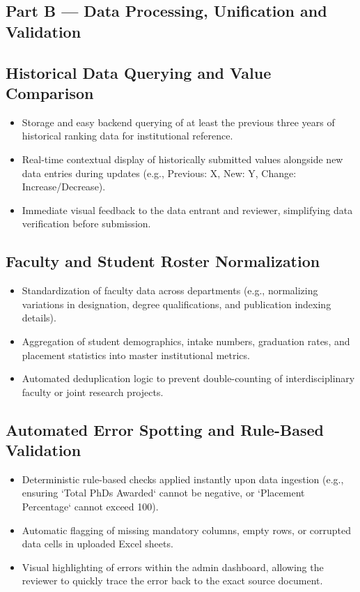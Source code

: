 \documentclass[11pt]{article}
\begin{document}
\subsection*{Part B --- Data Processing, Unification and Validation}

\subsection{Historical Data Querying and Value Comparison}
\begin{itemize}[leftmargin=1.4em, itemsep=3pt]
\item Storage and easy backend querying of at least the previous three years of historical ranking data for institutional reference.
\item Real-time contextual display of historically submitted values alongside new data entries during updates (e.g., Previous: X, New: Y, Change: Increase/Decrease).
\item Immediate visual feedback to the data entrant and reviewer, simplifying data verification before submission.
\end{itemize}

\subsection{Faculty and Student Roster Normalization}
\begin{itemize}[leftmargin=1.4em, itemsep=3pt]
\item Standardization of faculty data across departments (e.g., normalizing variations in designation, degree qualifications, and publication indexing details).
\item Aggregation of student demographics, intake numbers, graduation rates, and placement statistics into master institutional metrics.
\item Automated deduplication logic to prevent double-counting of interdisciplinary faculty or joint research projects.
\end{itemize}

\subsection{Automated Error Spotting and Rule-Based Validation}
\begin{itemize}[leftmargin=1.4em, itemsep=3pt]
\item Deterministic rule-based checks applied instantly upon data ingestion (e.g., ensuring `Total PhDs Awarded` cannot be negative, or `Placement Percentage` cannot exceed 100).
\item Automatic flagging of missing mandatory columns, empty rows, or corrupted data cells in uploaded Excel sheets.
\item Visual highlighting of errors within the admin dashboard, allowing the reviewer to quickly trace the error back to the exact source document.
\end{itemize}
\end{document}
